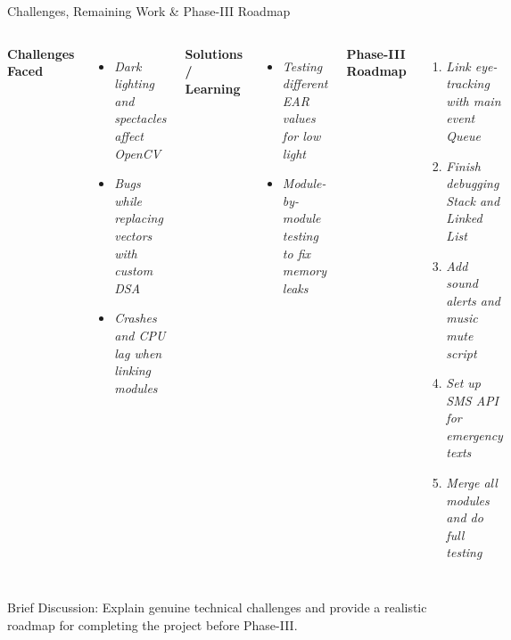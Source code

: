\documentclass[aspectratio=169,11pt]{beamer}
\newcommand{\smallnote}[1]{%
\vspace{0.08cm}
{\scriptsize\color{GEUGrey}#1}
}
\newcommand{\placeholder}[1]{%
\textit{\color{GEUGrey}#1}
}
\begin{document}
\begin{frame}{Challenges, Remaining Work \& Phase-III Roadmap}
\vspace{-2mm}
\begin{columns}[T,totalwidth=\textwidth]
\textbf{\color{GEUBlue}Challenges Faced}
\begin{itemize}\itemsep0pt
\item \placeholder{Dark lighting and spectacles affect OpenCV}
\item \placeholder{Bugs while replacing vectors with custom DSA}
\item \placeholder{Crashes and CPU lag when linking modules}
\end{itemize}

\vspace{1mm}
\textbf{\color{GEUBlue}Solutions / Learning}
\begin{itemize}\itemsep0pt
\item \placeholder{Testing different EAR values for low light}
\item \placeholder{Module-by-module testing to fix memory leaks}
\end{itemize}

\textbf{\color{GEUBlue}Phase-III Roadmap}
\begin{enumerate}\itemsep1pt
\item \placeholder{Link eye-tracking with main event Queue}
\item \placeholder{Finish debugging Stack and Linked List}
\item \placeholder{Add sound alerts and music mute script}
\item \placeholder{Set up SMS API for emergency texts}
\item \placeholder{Merge all modules and do full testing}
\end{enumerate}
\end{columns}

\vspace{2mm}
\smallnote{
Brief Discussion: Explain genuine technical challenges and provide
a realistic roadmap for completing the project before Phase-III.
}
\end{frame}
\end{document}

